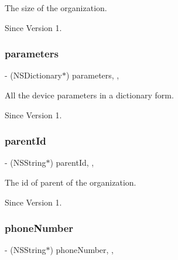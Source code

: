 The size of the organization. 

\begin{DoxySince}{Since}
Version 1. 
\end{DoxySince}
\hypertarget{class_x_i_organization_info_a175bee8a4633042ef477361ad31908dc}{}\label{class_x_i_organization_info_a175bee8a4633042ef477361ad31908dc} 
\subsubsection{\texorpdfstring{parameters}{parameters}}
{\footnotesize\ttfamily -\/ (N\+S\+Dictionary$\ast$) parameters\hspace{0.3cm}{\ttfamily [read]}, {\ttfamily [nonatomic]}, {\ttfamily [assign]}}



All the device parameters in a dictionary form. 

\begin{DoxySince}{Since}
Version 1. 
\end{DoxySince}
\hypertarget{class_x_i_organization_info_a28cc6a8c6ea642fe17a4773d019282c8}{}\label{class_x_i_organization_info_a28cc6a8c6ea642fe17a4773d019282c8} 
\subsubsection{\texorpdfstring{parent\+Id}{parentId}}
{\footnotesize\ttfamily -\/ (N\+S\+String$\ast$) parent\+Id\hspace{0.3cm}{\ttfamily [read]}, {\ttfamily [nonatomic]}, {\ttfamily [assign]}}



The id of parent of the organization. 

\begin{DoxySince}{Since}
Version 1. 
\end{DoxySince}
\hypertarget{class_x_i_organization_info_a673bbb419464ed3fd0dcd757a291b1a4}{}\label{class_x_i_organization_info_a673bbb419464ed3fd0dcd757a291b1a4} 
\subsubsection{\texorpdfstring{phone\+Number}{phoneNumber}}
{\footnotesize\ttfamily -\/ (N\+S\+String$\ast$) phone\+Number\hspace{0.3cm}{\ttfamily [read]}, {\ttfamily [nonatomic]}, {\ttfamily [assign]}}




